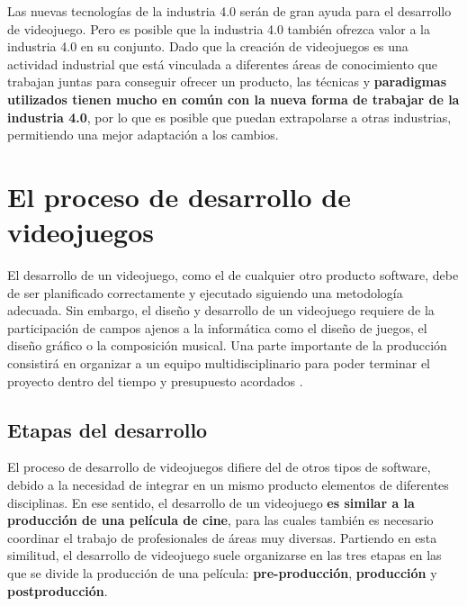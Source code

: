Las nuevas tecnologías de la industria 4.0 serán de gran ayuda para el desarrollo de videojuego. Pero es posible que la industria 4.0 también ofrezca valor a la industria 4.0 en su conjunto. Dado que la creación de videojuegos es una actividad industrial que está vinculada a diferentes áreas de conocimiento que trabajan juntas para conseguir ofrecer un producto, las técnicas y \textbf{paradigmas utilizados tienen mucho en común con la nueva forma de trabajar de la industria 4.0}, por lo que es posible que puedan extrapolarse a otras industrias, permitiendo una mejor adaptación a los cambios.

\section{El proceso de desarrollo de videojuegos}
El desarrollo de un videojuego, como el de cualquier otro producto software, debe de ser planificado correctamente y ejecutado siguiendo una metodología adecuada. Sin embargo, el diseño y desarrollo de un videojuego requiere de la participación de campos ajenos a la informática como el diseño de juegos, el diseño gráfico o la composición musical. Una parte importante de la producción consistirá en organizar a un equipo multidisciplinario para poder terminar el proyecto dentro del tiempo y presupuesto acordados \cite{libro_esi}.

\subsection{Etapas del desarrollo}
El proceso de desarrollo de videojuegos difiere del de otros tipos de software, debido a la necesidad de integrar en un mismo producto elementos de diferentes disciplinas. En ese sentido, el desarrollo de un videojuego \textbf{es similar a la producción de una película de cine}, para las cuales también es necesario coordinar el trabajo de profesionales de áreas muy diversas. Partiendo en esta similitud, el desarrollo de videojuego suele organizarse en las tres etapas en las que se divide la producción de una película: \textbf{pre-producción}, \textbf{producción} y \textbf{postproducción}.

